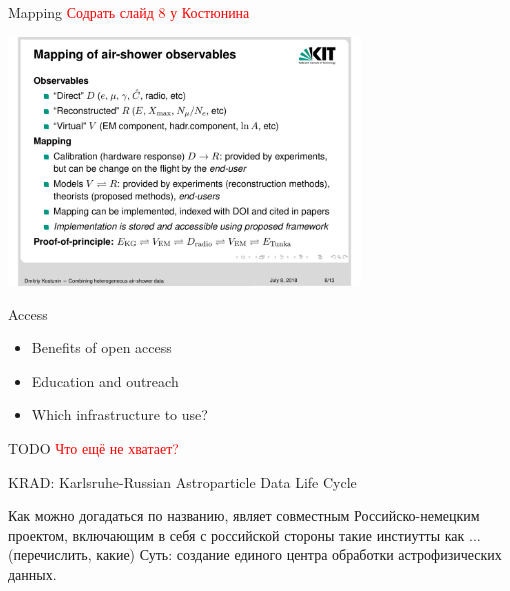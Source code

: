 \documentclass[18pt]{beamer}
\begin{document}
\begin{frame}{Mapping}
\textcolor{red}{Содрать слайд 8 у Костюнина}
\begin{center}
  \includegraphics[width=0.7\textwidth]{k8.pdf}
\end{center}
\end{frame}

\begin{frame}{Access}
\begin{itemize}
  \item Benefits of open access
  \item Education and outreach
  \item Which infrastructure to use?
\end{itemize}
\end{frame}

\begin{frame}{TODO}
\textcolor{red}{Что ещё не хватает?}
\end{frame}

\begin{frame}{\textcolor{kit-green100}{KRAD}: \textcolor{kit-green100}{K}arlsruhe-\textcolor{kit-green100}{R}ussian \textcolor{kit-green100}{A}stroparticle \textcolor{kit-green100}{D}ata Life Cycle}

Как можно догадаться по названию, являет совместным Российско-немецким проектом, включающим в себя с российской стороны такие инстиутты как ... (перечислить, какие)
Суть: создание единого центра обработки астрофизических данных.
\end{frame}
\end{document}
